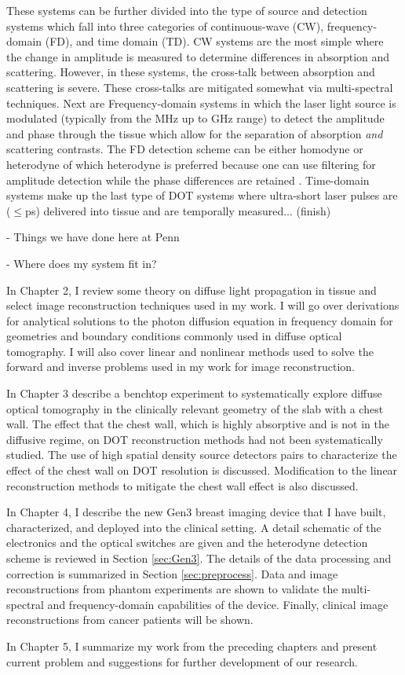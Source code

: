 These systems can be further divided into the type of source and detection systems which fall into three categories of continuous-wave (CW), frequency-domain (FD), and time domain (TD). CW systems are the most simple where the change in amplitude is measured to determine differences in absorption and scattering. However, in these systems, the cross-talk between absorption and scattering is severe. These cross-talks are mitigated somewhat via multi-spectral techniques. Next are Frequency-domain systems in which the laser light source is modulated (typically from the MHz up to GHz range) to detect the amplitude and phase through the tissue which allow for the separation of absorption \textit{and} scattering contrasts. The FD detection scheme can be either homodyne or heterodyne of which heterodyne is preferred because one can use filtering for amplitude detection while the phase differences are retained \cite{Nissilae2002}. Time-domain systems make up the last type of DOT systems where ultra-short laser pulses are ($\leq $ps) delivered into tissue and are temporally measured... (finish)

- Things we have done here at Penn

- Where does my system fit in?

In Chapter 2, I review some theory on diffuse light propagation in tissue and select image reconstruction techniques used in my work. I will go over derivations for analytical solutions to the photon diffusion equation in frequency domain for geometries and boundary conditions commonly used in diffuse optical tomography. I will also cover linear and nonlinear methods used to solve the forward and inverse problems used in my work for image reconstruction.

In Chapter 3 describe a benchtop experiment to systematically explore diffuse optical tomography in the clinically relevant geometry of the slab with a chest wall. The effect that the chest wall, which is highly absorptive and is not in the diffusive regime, on DOT reconstruction methods had not been systematically studied. The use of high spatial density source detectors pairs to characterize the effect of the chest wall on DOT resolution is discussed. Modification to the linear reconstruction methods to mitigate the chest wall effect is also discussed.

In Chapter 4, I describe the new Gen3 breast imaging device that I have built, characterized, and deployed
into the clinical setting.  A detail schematic of the electronics and the optical switches are given and the heterodyne detection scheme is reviewed in Section \ref{sec:Gen3}. The details of the data processing and correction is summarized in Section \ref{sec:preprocess}. Data and image reconstructions from phantom experiments are shown to validate the multi-spectral and frequency-domain capabilities of the device. Finally, clinical image reconstructions from cancer patients will be shown.

In Chapter 5, I summarize my work from the preceding chapters and present current problem and suggestions for further development of our research.





